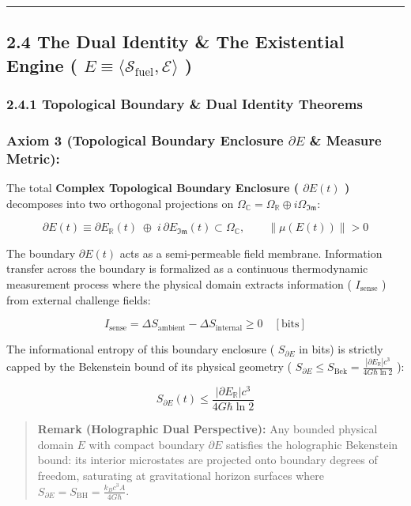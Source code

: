 \documentclass[11pt,a4paper]{article}
\theoremstyle{definition}\newtheorem{definition}{Definition}
\theoremstyle{remark}\newtheorem{remark}{Remark}
\begin{document}
\noindent\rule{\linewidth}{0.4pt}
\subsection{2.4 The Dual Identity \& The Existential Engine ( $E \equiv \langle \mathcal{S}_{\text{fuel}}, \mathcal{E} \rangle$ )}
\subsubsection{2.4.1 Topological Boundary \& Dual Identity Theorems}
\subsubsection{Axiom 3 (Topological Boundary Enclosure $\partial E$ \& Measure Metric):}

The total \textbf{Complex Topological Boundary Enclosure ( $\partial E(t)$ )} decomposes into two orthogonal projections on $\Omega_{\mathbb{C}} = \Omega_{\mathbb{R}} \oplus i \Omega_{\mathfrak{Im}}$:


\begin{equation}
\boxed{\partial E(t) \equiv \partial E_{\mathbb{R}}(t) \;\oplus\; i \, \partial E_{\mathfrak{Im}}(t) \subset \Omega_{\mathbb{C}}, \qquad \|\mu(E(t))\| > 0}
\end{equation}


The boundary $\partial E(t)$ acts as a semi-permeable field membrane. Information transfer across the boundary is formalized as a continuous thermodynamic measurement process where the physical domain extracts information ( $I_{\text{sense}}$ ) from external challenge fields:


\begin{equation}
\boxed{I_{\text{sense}} = \Delta S_{\text{ambient}} - \Delta S_{\text{internal}} \ge 0 \quad [\mathrm{bits}]}
\end{equation}


The informational entropy of this boundary enclosure ( $S_{\partial E}$ in bits) is strictly capped by the Bekenstein bound of its physical geometry ( $S_{\partial E} \le S_{\text{Bek}} = \frac{|\partial E_{\mathbb{R}}|c^3}{4G\hbar\ln 2}$ ):


\begin{equation}
\boxed{S_{\partial E}(t) \le \frac{|\partial E_{\mathbb{R}}|c^3}{4G\hbar\ln 2}}
\end{equation}


\begin{quote}\textbf{Remark (Holographic Dual Perspective):} Any bounded physical domain $E$ with compact boundary $\partial E$ satisfies the holographic Bekenstein bound: its interior microstates are projected onto boundary degrees of freedom, saturating at gravitational horizon surfaces where $S_{\partial E} = S_{\text{BH}} = \frac{k_B c^3 A}{4 G \hbar}$.\end{quote}
\end{document}

